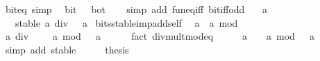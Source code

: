 \begin{isabellebody}
\endisatagproof
{\isafoldproof}%
%
\isadelimproof
\isanewline
%
\endisadelimproof
\isanewline
{}\isamarkupfalse%
\ bit{\isacharunderscore}{\kern0pt}{}{\isacharunderscore}{\kern0pt}eq\ {\isacharbrackleft}{\kern0pt}simp{\isacharbrackright}{\kern0pt}{\isacharcolon}{\kern0pt}\isanewline
\ \ {\isacartoucheopen}bit\ {}\ {\isacharequal}{\kern0pt}\ bot{\isacartoucheclose}\isanewline
%
\isadelimproof
\ \ %
\endisadelimproof
%
\isatagproof
{}\isamarkupfalse%
\ {\isacharparenleft}{\kern0pt}simp\ add{\isacharcolon}{\kern0pt}\ fun{\isacharunderscore}{\kern0pt}eq{\isacharunderscore}{\kern0pt}iff\ bit{\isacharunderscore}{\kern0pt}iff{\isacharunderscore}{\kern0pt}odd{\isacharparenright}{\kern0pt}%
\endisatagproof
{\isafoldproof}%
%
\isadelimproof
\isanewline
%
\endisadelimproof
\isanewline
{}\isamarkupfalse%
\isanewline
\ \ \ a\isanewline
\ \ \ stable{\isacharcolon}{\kern0pt}\ {\isacartoucheopen}a\ div\ {}\ {\isacharequal}{\kern0pt}\ a{\isacartoucheclose}\isanewline
{}\isanewline
\isanewline
{}\isamarkupfalse%
\ bits{\isacharunderscore}{\kern0pt}stable{\isacharunderscore}{\kern0pt}imp{\isacharunderscore}{\kern0pt}add{\isacharunderscore}{\kern0pt}self{\isacharcolon}{\kern0pt}\isanewline
\ \ {\isacartoucheopen}a\ {\isacharplus}{\kern0pt}\ a\ mod\ {}\ {\isacharequal}{\kern0pt}\ {}{\isacartoucheclose}\isanewline
%
\isadelimproof
%
\endisadelimproof
%
\isatagproof
{}\isamarkupfalse%
\ {\isacharminus}{\kern0pt}\isanewline
\ \ \isamarkupfalse%
\ {\isacartoucheopen}a\ div\ {}\ {\isacharasterisk}{\kern0pt}\ {}\ {\isacharplus}{\kern0pt}\ a\ mod\ {}\ {\isacharequal}{\kern0pt}\ a{\isacartoucheclose}\isanewline
\ \ \ \ \isamarkupfalse%
\ {\isacharparenleft}{\kern0pt}fact\ div{\isacharunderscore}{\kern0pt}mult{\isacharunderscore}{\kern0pt}mod{\isacharunderscore}{\kern0pt}eq{\isacharparenright}{\kern0pt}\isanewline
\ \ \isamarkupfalse%
\ \isamarkupfalse%
\ {\isacartoucheopen}a\ {\isacharasterisk}{\kern0pt}\ {}\ {\isacharplus}{\kern0pt}\ a\ mod\ {}\ {\isacharequal}{\kern0pt}\ a{\isacartoucheclose}\isanewline
\ \ \ \ \isamarkupfalse%
\ {\isacharparenleft}{\kern0pt}simp\ add{\isacharcolon}{\kern0pt}\ stable{\isacharparenright}{\kern0pt}\isanewline
\ \ \isamarkupfalse%
\ \isamarkupfalse%
\ {\isacharquery}{\kern0pt}thesis\isanewline

\end{isabellebody}
